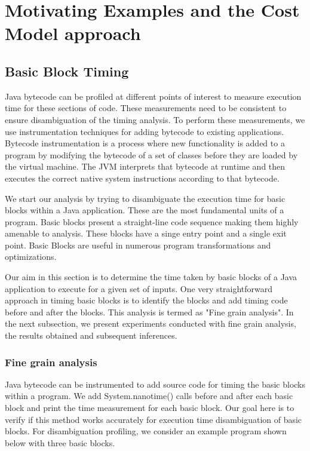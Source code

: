 \chapter{Motivating Examples and the Cost Model approach}
\label{examples}
\section{Basic Block Timing}
Java bytecode can be profiled at different points of interest to measure execution time for these sections of code. These measurements need to be consistent to ensure disambiguation of the timing analysis. To perform these measurements, we use instrumentation techniques for adding bytecode to existing applications. Bytecode instrumentation is a process where new functionality is added to a program by modifying the bytecode of a set of classes before they are loaded by the virtual machine. The JVM interprets that bytecode at runtime and then executes the correct native system instructions according to that bytecode.\newline 

We start our analysis by trying to disambiguate the execution time for basic blocks within a Java application. These are the most fundamental units of a program. Basic blocks present a straight-line code sequence making them highly amenable to analysis. These blocks have a singe entry point and a single exit point. Basic Blocks are useful in numerous program transformations and optimizations.\newline

Our aim in this section is to determine the time taken by basic blocks of a Java application to execute for a given set of inputs. One very straightforward approach in timing basic blocks is to identify the blocks and add timing code before and after the blocks. This analysis is termed as "Fine grain analysis". In the next subsection, we present experiments conducted with fine grain analysis, the results obtained and subsequent inferences.

\subsection{Fine grain analysis}
Java bytecode can be instrumented to add source code for timing the basic blocks within a program. We add System.nanotime() calls before and after each basic block and print the time measurement for each basic block. Our goal here is to verify if this method works accurately for execution time disambiguation of basic blocks. For disambiguation profiling, we consider an example program shown below with three basic blocks.\newline

